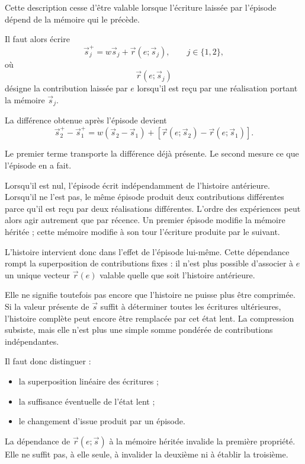 Cette description cesse d'être valable lorsque l'écriture laissée par l'épisode dépend de la mémoire qui le précède.

Il faut alors écrire
\[
\vec s_j^{+}
=
w\vec s_j+\vec r(e;\vec s_j),
\qquad
j\in\{1,2\},
\]
où
\[
\vec r(e;\vec s_j)
\]
désigne la contribution laissée par $e$ lorsqu'il est reçu par une réalisation portant la mémoire $\vec s_j$.

La différence obtenue après l'épisode devient
\begin{equation}
\label{eq:t3-ecriture-conditionnee}
\boxed{
\vec s_2^{+}-\vec s_1^{+}
=
w\left(\vec s_2-\vec s_1\right)
+
\left[
\vec r(e;\vec s_2)-\vec r(e;\vec s_1)
\right].
}
\end{equation}

Le premier terme transporte la différence déjà présente. Le second mesure ce que l'épisode en a fait.

Lorsqu'il est nul, l'épisode écrit indépendamment de l'histoire antérieure. Lorsqu'il ne l'est pas, le même épisode produit deux contributions différentes parce qu'il est reçu par deux réalisations différentes. L'ordre des expériences peut alors agir autrement que par récence. Un premier épisode modifie la mémoire héritée ; cette mémoire modifie à son tour l'écriture produite par le suivant.

L'histoire intervient donc dans l'effet de l'épisode lui-même. Cette dépendance rompt la superposition de contributions fixes : il n'est plus possible d'associer à $e$ un unique vecteur $\vec r(e)$ valable quelle que soit l'histoire antérieure.

Elle ne signifie toutefois pas encore que l'histoire ne puisse plus être comprimée. Si la valeur présente de $\vec s$ suffit à déterminer toutes les écritures ultérieures, l'histoire complète peut encore être remplacée par cet état lent. La compression subsiste, mais elle n'est plus une simple somme pondérée de contributions indépendantes.

Il faut donc distinguer :

\begin{itemize}
\tightlist
\item
  la superposition linéaire des écritures ;
\item
  la suffisance éventuelle de l'état lent ;
\item
  le changement d'issue produit par un épisode.
\end{itemize}

La dépendance de $\vec r(e;\vec s)$ à la mémoire héritée invalide la première propriété. Elle ne suffit pas, à elle seule, à invalider la deuxième ni à établir la troisième.

